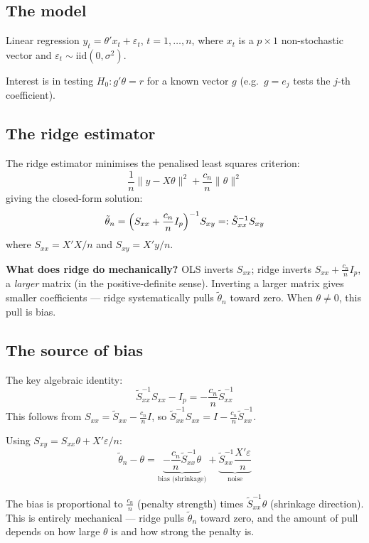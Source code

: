 \documentclass[11pt]{article}
\theoremstyle{definition}
\begin{document}
\subsection{The model}
 
Linear regression $y_t = \theta'x_t + \varepsilon_t$, $t = 1,\ldots,n$,
where $x_t$ is a $p \times 1$ non-stochastic vector and
$\varepsilon_t \sim \text{iid}(0,\sigma^2)$.
 
\medskip
 
Interest is in testing $H_0 : g'\theta = r$ for a known vector $g$
(e.g.\ $g = e_j$ tests the $j$-th coefficient).
 
\subsection{The ridge estimator}
 
The ridge estimator minimises the penalised least squares criterion:
\[
  \frac{1}{n}\|y - X\theta\|^2 + \frac{c_n}{n}\|\theta\|^2
\]
giving the closed-form solution:
\[
  \tilde\theta_n
  = \Bigl(S_{xx} + \frac{c_n}{n}I_p\Bigr)^{-1} S_{xy}
  =: \tilde S_{xx}^{-1} S_{xy}
\]
where $S_{xx} = X'X/n$ and $S_{xy} = X'y/n$.
 
\medskip
 
\textbf{What does ridge do mechanically?}
OLS inverts $S_{xx}$; ridge inverts $S_{xx} + \frac{c_n}{n}I_p$, a
\textit{larger} matrix (in the positive-definite sense). Inverting a
larger matrix gives smaller coefficients --- ridge systematically pulls
$\tilde\theta_n$ toward zero. When $\theta \ne 0$, this pull is bias.
 
\subsection{The source of bias}
 
The key algebraic identity:
\[
  \tilde S_{xx}^{-1} S_{xx} - I_p = -\frac{c_n}{n}\tilde S_{xx}^{-1}
\]
This follows from $S_{xx} = \tilde S_{xx} - \frac{c_n}{n}I$, so
$\tilde S_{xx}^{-1} S_{xx} = I - \frac{c_n}{n}\tilde S_{xx}^{-1}$.
 
\medskip
 
Using $S_{xy} = S_{xx}\theta + X'\varepsilon/n$:
\[
  \tilde\theta_n - \theta
  = \underbrace{-\frac{c_n}{n}\tilde S_{xx}^{-1}\theta}_{\text{bias (shrinkage)}}
  + \underbrace{\tilde S_{xx}^{-1}\frac{X'\varepsilon}{n}}_{\text{noise}}
\]
 
The bias is proportional to $\frac{c_n}{n}$ (penalty strength) times
$\tilde S_{xx}^{-1}\theta$ (shrinkage direction). This is entirely
mechanical --- ridge pulls $\tilde\theta_n$ toward zero, and the amount
of pull depends on how large $\theta$ is and how strong the penalty is.
 
\end{document}

